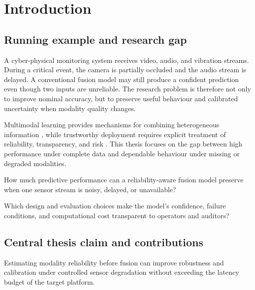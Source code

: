 \chapter{Introduction}\label{ch:m-introduction}
\section{Running example and research gap}
A cyber-physical monitoring system receives video, audio, and vibration streams. During a critical event, the camera is partially occluded and the audio stream is delayed. A conventional fusion model may still produce a confident prediction even though two inputs are unreliable. The research problem is therefore not only to improve nominal accuracy, but to preserve useful behaviour and calibrated uncertainty when modality quality changes.

Multimodal learning provides mechanisms for combining heterogeneous information \cite{goodfellow2016deep}, while trustworthy deployment requires explicit treatment of reliability, transparency, and risk \cite{nist2023airmf}. This thesis focuses on the gap between high performance under complete data and dependable behaviour under missing or degraded modalities.

\begin{researchquestion}[RQ1 -- Robustness]
How much predictive performance can a reliability-aware fusion model preserve when one sensor stream is noisy, delayed, or unavailable?
\end{researchquestion}

\begin{researchquestion}[RQ2 -- Trust]
Which design and evaluation choices make the model's confidence, failure conditions, and computational cost transparent to operators and auditors?
\end{researchquestion}

\section{Central thesis claim and contributions}
\begin{resultbox}
Estimating modality reliability before fusion can improve robustness and calibration under controlled sensor degradation without exceeding the latency budget of the target platform.
\end{resultbox}

